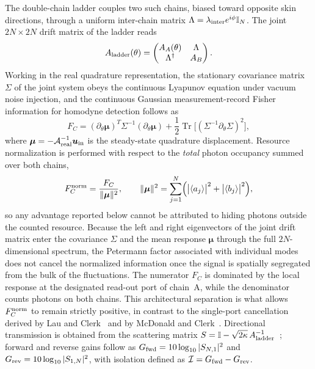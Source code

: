 \documentclass[aps,prxquantum,preprint,superscriptaddress,amsmath,amssymb]{revtex4-2}
\newcommand{\Tr}{\operatorname{Tr}}
\newcommand{\Fnorm}{F_C^{\rm norm}}
\newcommand{\Gfwd}{G_{\rm fwd}}
\newcommand{\Grev}{G_{\rm rev}}
\newcommand{\Iso}{\mathcal{I}}
\newcommand{\lint}{\lambda_{\rm inter}}
\begin{document}
The double-chain ladder couples two such chains, biased toward opposite skin directions, through a uniform inter-chain matrix $\Lambda=\lint e^{i\phi}\mathbb{I}_N$. The joint $2N\times2N$ drift matrix of the ladder reads
\begin{equation}\label{eq:ladder_drift}
A_{\rm ladder}(\theta)=
\begin{pmatrix}
A_A(\theta) & \Lambda \\
\Lambda^\dagger & A_B
\end{pmatrix}.
\end{equation}
Working in the real quadrature representation, the stationary covariance matrix $\Sigma$ of the joint system obeys the continuous Lyapunov equation under vacuum noise injection, and the continuous Gaussian measurement-record Fisher information for homodyne detection follows as
\begin{equation}\label{eq:record_fisher}
F_C=(\partial_\theta\bm{\mu})^{T}\Sigma^{-1}(\partial_\theta\bm{\mu})+\frac{1}{2}\Tr\!\bigl[(\Sigma^{-1}\partial_\theta\Sigma)^2\bigr],
\end{equation}
where $\bm{\mu}=-\mathcal{A}_{\rm real}^{-1}\bm{u}_{\rm in}$ is the steady-state quadrature displacement. Resource normalization is performed with respect to the \emph{total} photon occupancy summed over both chains,
\begin{equation}\label{eq:norm}
\Fnorm=\frac{F_C}{\|\bm{\mu}\|^2},
\qquad
\|\bm{\mu}\|^2=\sum_{j=1}^{N}\Bigl(\bigl|\braket{a_j}\bigr|^2+\bigl|\braket{b_j}\bigr|^2\Bigr),
\end{equation}
so any advantage reported below cannot be attributed to hiding photons outside the counted resource. Because the left and right eigenvectors of the joint drift matrix enter the covariance $\Sigma$ and the mean response $\bm{\mu}$ through the full $2N$-dimensional spectrum, the Petermann factor associated with individual modes does not cancel the normalized information once the signal is spatially segregated from the bulk of the fluctuations. The numerator $F_C$ is dominated by the local response at the designated read-out port of chain~A, while the denominator counts photons on both chains. This architectural separation is what allows $\Fnorm$ to remain strictly positive, in contrast to the single-port cancellation derived by Lau and Clerk~\citep{Lau2018} and by McDonald and Clerk~\citep{McDonald2020}. Directional transmission is obtained from the scattering matrix $S=\mathbb{I}-\sqrt{2\kappa}\,A_{\rm ladder}^{-1}$~\citep{Clerk2010}; forward and reverse gains follow as $\Gfwd=10\log_{10}|S_{N,1}|^2$ and $\Grev=10\log_{10}|S_{1,N}|^2$, with isolation defined as $\Iso=\Gfwd-\Grev$.
\end{document}
